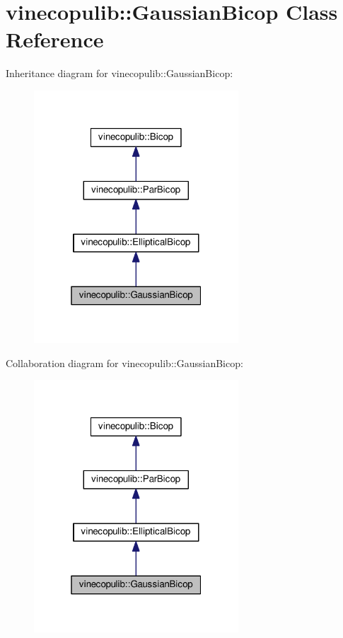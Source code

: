 \hypertarget{classvinecopulib_1_1_gaussian_bicop}{}\section{vinecopulib\+:\+:Gaussian\+Bicop Class Reference}
\label{classvinecopulib_1_1_gaussian_bicop}


Inheritance diagram for vinecopulib\+:\+:Gaussian\+Bicop\+:\nopagebreak
\begin{figure}[H]
\begin{center}
\leavevmode
\includegraphics[width=217pt]{classvinecopulib_1_1_gaussian_bicop__inherit__graph}
\end{center}
\end{figure}


Collaboration diagram for vinecopulib\+:\+:Gaussian\+Bicop\+:\nopagebreak
\begin{figure}[H]
\begin{center}
\leavevmode
\includegraphics[width=217pt]{classvinecopulib_1_1_gaussian_bicop__coll__graph}
\end{center}
\end{figure}
